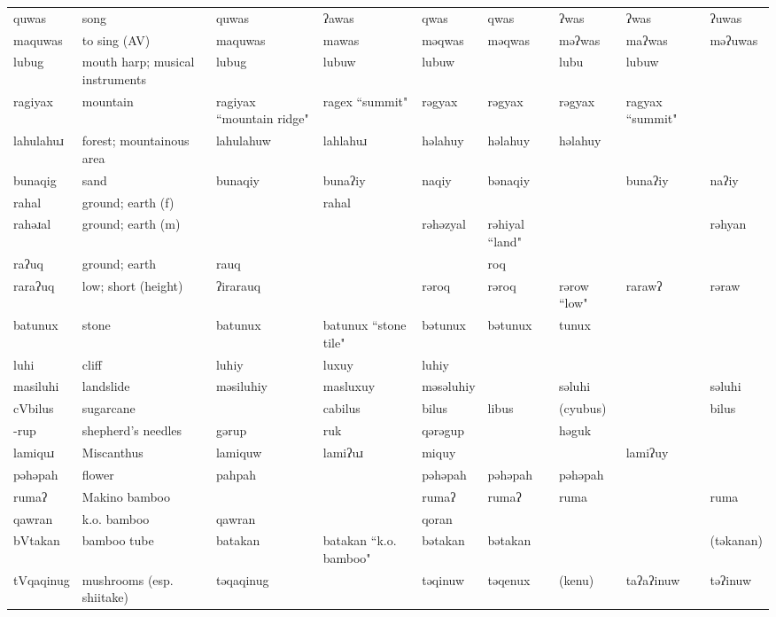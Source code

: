 \begin{landscape}
\begin{longtable}{*{9}{>{\raggedright\arraybackslash}p{}}}
\text{*}quwas & song & quwas & ʔawas & qwas & qwas & ʔwas & ʔwas & ʔuwas\\
\text{*}maquwas & to sing (AV) & maquwas & mawas & məqwas & məqwas & məʔwas & maʔwas & məʔuwas\\
\text{*}lubug & mouth harp; musical instruments & lubug & lubuw & lubuw &  & lubu & lubuw & \\
\text{*}ragiyax & mountain & ragiyax ``mountain ridge" & ragex ``summit" & rəgyax & rəgyax & rəgyax & ragyax ``summit" & \\
\text{*}lahulahuɹ & forest; mountainous area & lahulahuw & lahlahuɹ & həlahuy & həlahuy & həlahuy &  & \\
\text{*}bunaqig & sand & bunaqiy & bunaʔiy & naqiy & bənaqiy &  & bunaʔiy & naʔiy\\
\text{*}rahal & ground; earth (f) &  & rahal &  &  &  &  & \\
\text{*}rahəɹal & ground; earth (m) &  &  & rəhəzyal & rəhiyal ``land" &  &  & rəhyan\\
\text{*}raʔuq & ground; earth & rauq &  &  & roq &  &  & \\
\text{*}raraʔuq & low; short (height) & ʔirarauq &  & rəroq & rəroq & rərow ``low" & rarawʔ & rəraw\\
\text{*}batunux & stone & batunux & batunux ``stone tile" & bətunux & bətunux & tunux &  & \\
\text{*}luhi & cliff & luhiy & luxuy & luhiy &  &  &  & \\
\text{*}masiluhi & landslide & məsiluhiy & masluxuy & məsəluhiy &  & səluhi &  & səluhi\\
\text{*}cVbilus & sugarcane &  & cabilus & bilus & libus & (cyubus) &  & bilus\\
\text{*}-rup & shepherd's needles & gərup & ruk & qərəgup &  & həguk &  & \\
\text{*}lamiquɹ & Miscanthus & lamiquw & lamiʔuɹ & miquy &  &  & lamiʔuy & \\
\text{*}pəhəpah & flower & pahpah &  & pəhəpah & pəhəpah & pəhəpah &  & \\
\text{*}rumaʔ & Makino bamboo &  &  & rumaʔ & rumaʔ & ruma &  & ruma\\
\text{*}qawran & k.o. bamboo & qawran &  & qoran &  &  &  & \\
\text{*}bVtakan & bamboo tube & batakan & batakan ``k.o. bamboo" & bətakan & bətakan &  &  & (təkanan)\\
\text{*}tVqaqinug & mushrooms (esp. shiitake) & təqaqinug &  & təqinuw & təqenux & (kenu) & taʔaʔinuw & təʔinuw\\

\end{longtable}
\end{landscape}
